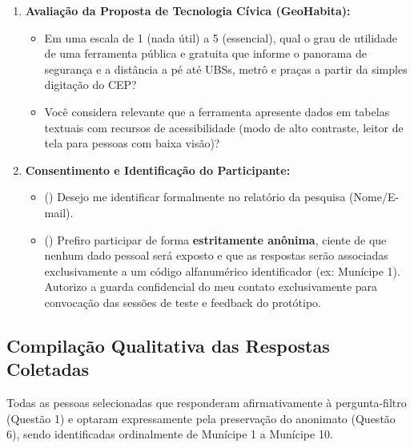 \begin{enumerate}[leftmargin=*]
    \item \textbf{Avaliação da Proposta de Tecnologia Cívica (GeoHabita):}
    \begin{itemize}[leftmargin=1.5em]
        \item Em uma escala de 1 (nada útil) a 5 (essencial), qual o grau de utilidade de uma ferramenta pública e gratuita que informe o panorama de segurança e a distância a pé até UBSs, metrô e praças a partir da simples digitação do CEP?
        \item Você considera relevante que a ferramenta apresente dados em tabelas textuais com recursos de acessibilidade (modo de alto contraste, leitor de tela para pessoas com baixa visão)?
    \end{itemize}

    \item \textbf{Consentimento e Identificação do Participante:}
    \begin{itemize}[leftmargin=1.5em]
        \item[] (\quad) Desejo me identificar formalmente no relatório da pesquisa (Nome/E-mail).
        \item[] (\quad) Prefiro participar de forma \textbf{estritamente anônima}, ciente de que nenhum dado pessoal será exposto e que as respostas serão associadas exclusivamente a um código alfanumérico identificador (ex: Munícipe 1). Autorizo a guarda confidencial do meu contato exclusivamente para convocação das sessões de teste e feedback do protótipo.
    \end{itemize}
\end{enumerate}

\vspace{1em}

\subsection{Compilação Qualitativa das Respostas Coletadas}

Todas as pessoas selecionadas que responderam afirmativamente à pergunta-filtro (Questão 1) e optaram expressamente pela preservação do anonimato (Questão 6), sendo identificadas ordinalmente de Munícipe 1 a Munícipe 10.

